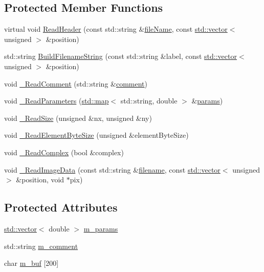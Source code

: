 \subsection*{Protected Member Functions}
\begin{DoxyCompactItemize}
\item 
virtual void \hyperlink{class_q_s_t_e_m_1_1_c_img_reader_a58988cb3ab5d0545d2e561592b31ccbf}{Read\-Header} (const std\-::string \&\hyperlink{qmb_8m_a7a230f02bdffebd1357e3c0b49e01271}{file\-Name}, const \hyperlink{qmb_8m_af54b69a32590de218622e869b06b47b3}{std\-::vector}$<$ unsigned $>$ \&position)
\item 
std\-::string \hyperlink{class_q_s_t_e_m_1_1_c_img_reader_a7cace40ef620bdc3c016d7368c688a02}{Build\-Filename\-String} (const std\-::string \&label, const \hyperlink{qmb_8m_af54b69a32590de218622e869b06b47b3}{std\-::vector}$<$ unsigned $>$ \&position)
\item 
void \hyperlink{class_q_s_t_e_m_1_1_c_img_reader_ac75b034f8761774ce5b8e52339458081}{\-\_\-\-Read\-Comment} (std\-::string \&\hyperlink{image_sim_8m_aea4cc4bd8e43a7f8ebf9b0ee3da8d681}{comment})
\item 
void \hyperlink{class_q_s_t_e_m_1_1_c_img_reader_a1d8fe49bb1e06bae835250d3481021fe}{\-\_\-\-Read\-Parameters} (\hyperlink{_displacement_params_8m_af619c74fd72bdb64d115463dff2720cd}{std\-::map}$<$ std\-::string, double $>$ \&\hyperlink{image_sim_8m_ad57b218fb254a1624c09ad71cb6b6415}{params})
\item 
void \hyperlink{class_q_s_t_e_m_1_1_c_img_reader_a1739be0baa35e01167363bc35541311e}{\-\_\-\-Read\-Size} (unsigned \&nx, unsigned \&ny)
\item 
void \hyperlink{class_q_s_t_e_m_1_1_c_img_reader_ad2c452a94fc4be93440a57a1c71b5fe4}{\-\_\-\-Read\-Element\-Byte\-Size} (unsigned \&element\-Byte\-Size)
\item 
void \hyperlink{class_q_s_t_e_m_1_1_c_img_reader_a83c25a2f3d9683d116751ad3b37241de}{\-\_\-\-Read\-Complex} (bool \&complex)
\item 
void \hyperlink{class_q_s_t_e_m_1_1_c_img_reader_a9149fbc2b8545ed0d3a0c62bc267d137}{\-\_\-\-Read\-Image\-Data} (const std\-::string \&\hyperlink{write_fields2_file_8m_af3723aa817dbb65282d5e1db81f08ad8}{filename}, const \hyperlink{qmb_8m_af54b69a32590de218622e869b06b47b3}{std\-::vector}$<$ unsigned $>$ \&position, void $\ast$pix)
\end{DoxyCompactItemize}
\subsection*{Protected Attributes}
\begin{DoxyCompactItemize}
\item 
\hyperlink{qmb_8m_af54b69a32590de218622e869b06b47b3}{std\-::vector}$<$ double $>$ \hyperlink{class_q_s_t_e_m_1_1_c_img_reader_ae4a0dfe8ad3a533128029463104a2355}{m\-\_\-params}
\item 
std\-::string \hyperlink{class_q_s_t_e_m_1_1_c_img_reader_a027b20904b4869088f6bbabdd28447bf}{m\-\_\-comment}
\item 
char \hyperlink{class_q_s_t_e_m_1_1_c_img_reader_a9ae588dd89cb7517d582300bcfbb0aba}{m\-\_\-buf} \mbox{[}200\mbox{]}
\end{DoxyCompactItemize}
